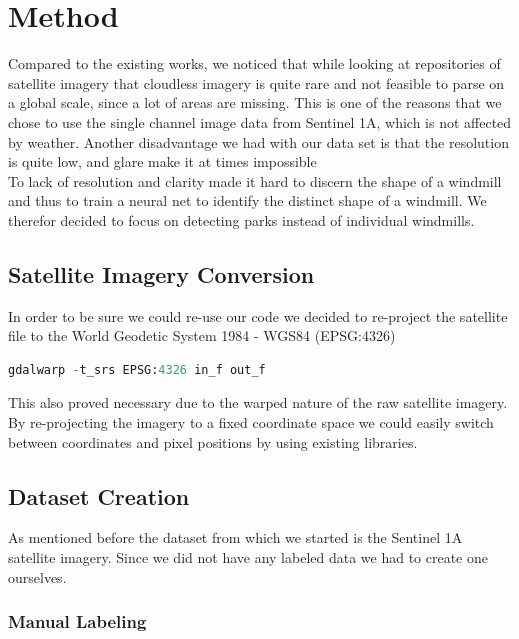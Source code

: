 \section{Method}
%

Compared to the existing works, we noticed that while looking at repositories of satellite imagery that cloudless imagery is quite rare and not feasible to parse on a global scale, since a lot of areas are missing. This is one of the reasons that we chose to use the single channel image data from Sentinel 1A, which is not affected by weather. Another disadvantage we had with our data set is that the resolution is quite low, and glare make it at times impossible \\

To lack of resolution and clarity made it hard to discern the shape of a windmill and thus to train a neural net to identify the distinct shape of a windmill. We therefor decided to focus on detecting parks instead of individual windmills.

\subsection{Satellite Imagery Conversion}

In order to be sure we could re-use our code we decided to re-project the satellite file to the World Geodetic System 1984 - WGS84 (EPSG:4326) 

\begin{lstlisting}[language=Python,breaklines=true]
gdalwarp -t_srs EPSG:4326 in_f out_f
\end{lstlisting}

This also proved necessary due to the warped nature of the raw satellite imagery. By re-projecting the imagery to a fixed coordinate space we could easily switch between coordinates and pixel positions by using existing libraries. 

\subsection{Dataset Creation}

As mentioned before the dataset from which we started is the Sentinel 1A satellite imagery. Since we did not have any labeled data we had to create one ourselves.

\subsubsection{Manual Labeling}

